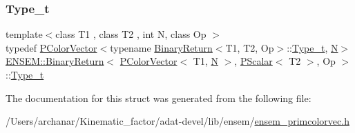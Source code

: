 \subsubsection{\texorpdfstring{Type\_t}{Type\_t}\hspace{0.1cm}{\footnotesize\ttfamily [3/3]}}
{\footnotesize\ttfamily template$<$class T1 , class T2 , int N, class Op $>$ \\
typedef \mbox{\hyperlink{classENSEM_1_1PColorVector}{P\+Color\+Vector}}$<$typename \mbox{\hyperlink{structENSEM_1_1BinaryReturn}{Binary\+Return}}$<$T1, T2, Op$>$\+::\mbox{\hyperlink{structENSEM_1_1BinaryReturn_3_01PColorVector_3_01T1_00_01N_01_4_00_01PScalar_3_01T2_01_4_00_01Op_01_4_aa1c63622b6c827a70045ca780056506c}{Type\+\_\+t}}, \mbox{\hyperlink{adat__devel_2lib_2hadron_2operator__name__util_8cc_a7722c8ecbb62d99aee7ce68b1752f337}{N}}$>$ \mbox{\hyperlink{structENSEM_1_1BinaryReturn}{E\+N\+S\+E\+M\+::\+Binary\+Return}}$<$ \mbox{\hyperlink{classENSEM_1_1PColorVector}{P\+Color\+Vector}}$<$ T1, \mbox{\hyperlink{adat__devel_2lib_2hadron_2operator__name__util_8cc_a7722c8ecbb62d99aee7ce68b1752f337}{N}} $>$, \mbox{\hyperlink{classENSEM_1_1PScalar}{P\+Scalar}}$<$ T2 $>$, Op $>$\+::\mbox{\hyperlink{structENSEM_1_1BinaryReturn_3_01PColorVector_3_01T1_00_01N_01_4_00_01PScalar_3_01T2_01_4_00_01Op_01_4_aa1c63622b6c827a70045ca780056506c}{Type\+\_\+t}}}



The documentation for this struct was generated from the following file\+:\begin{DoxyCompactItemize}
\item 
/\+Users/archanar/\+Kinematic\+\_\+factor/adat-\/devel/lib/ensem/\mbox{\hyperlink{adat-devel_2lib_2ensem_2ensem__primcolorvec_8h}{ensem\+\_\+primcolorvec.\+h}}\end{DoxyCompactItemize}
